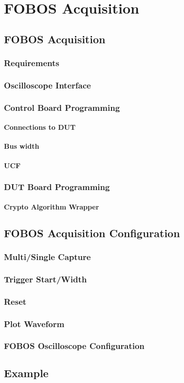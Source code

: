 \chapter{FOBOS Acquisition}

\section{FOBOS Acquisition}
\subsection{Requirements}
\subsection{Oscilloscope Interface}
\subsection{Control Board Programming}
	\subsubsection{Connections to DUT}
	 \subsubsection{Bus width}
	 \subsubsection{UCF}

 \subsection{DUT Board Programming}
 \subsubsection{Crypto Algorithm Wrapper}

\section{FOBOS Acquisition Configuration}
\subsection{Multi/Single Capture}
\subsection{Trigger Start/Width}
\subsection{Reset}
\subsection{Plot Waveform}
\subsection{FOBOS Oscilloscope Configuration}

\section{Example}